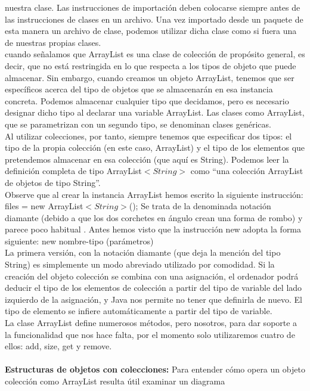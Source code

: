 \documentclass[11pt,a4paper]{article}
\begin{document}
	nuestra clase. Las instrucciones de importación deben colocarse siempre antes de las instrucciones
	de clases en un archivo. Una vez importado desde un paquete de esta manera un archivo de
	clase, podemos utilizar dicha clase como si fuera una de nuestras propias clases.\\
	cuando señalamos que ArrayList es una clase de colección de propósito general,
	es decir, que no está restringida en lo que respecta a los tipos de objeto que puede almacenar.
	Sin embargo, cuando creamos un objeto ArrayList, tenemos que ser específicos acerca
	del tipo de objetos que se almacenarán en esa instancia concreta. Podemos almacenar cualquier
	tipo que decidamos, pero es necesario designar dicho tipo al declarar una variable ArrayList.
	Las clases como ArrayList, que se parametrizan con un segundo tipo, se denominan clases
	genéricas.\\
	Al utilizar colecciones, por tanto, siempre tenemos que especificar dos tipos: el tipo de la propia
	colección (en este caso, ArrayList) y el tipo de los elementos que pretendemos almacenar
	en esa colección (que aquí es String). Podemos leer la definición completa de tipo ArrayList$<String>$ como “una colección ArrayList de objetos de tipo String”.\\
	Observe que al crear la instancia ArrayList hemos escrito la siguiente instrucción:
	files = new ArrayList$<String>$(); Se trata de la denominada notación diamante (debido a que los dos corchetes en ángulo crean una
	forma de rombo) y parece poco habitual . Antes hemos visto que la instrucción new adopta la forma
	siguiente:
	new nombre-tipo (parámetros)\\
	La primera versión, con la notación diamante (que
	deja la mención del tipo String) es simplemente un modo abreviado utilizado por comodidad.
	Si la creación del objeto colección se combina con una asignación, el ordenador podrá deducir el
	tipo de los elementos de colección a partir del tipo de variable del lado izquierdo de la asignación,
	y Java nos permite no tener que definirla de nuevo. El tipo de elemento se infiere automáticamente
	a partir del tipo de variable.\\
	La clase ArrayList define numerosos métodos, pero nosotros, para dar soporte a la funcionalidad
	que nos hace falta, por el momento solo utilizaremos cuatro de ellos: add, size, get y remove.\\
	\\
	\textbf{Estructuras de objetos con colecciones:} Para entender cómo opera un objeto colección como ArrayList resulta útil examinar un diagrama
\end{document}
